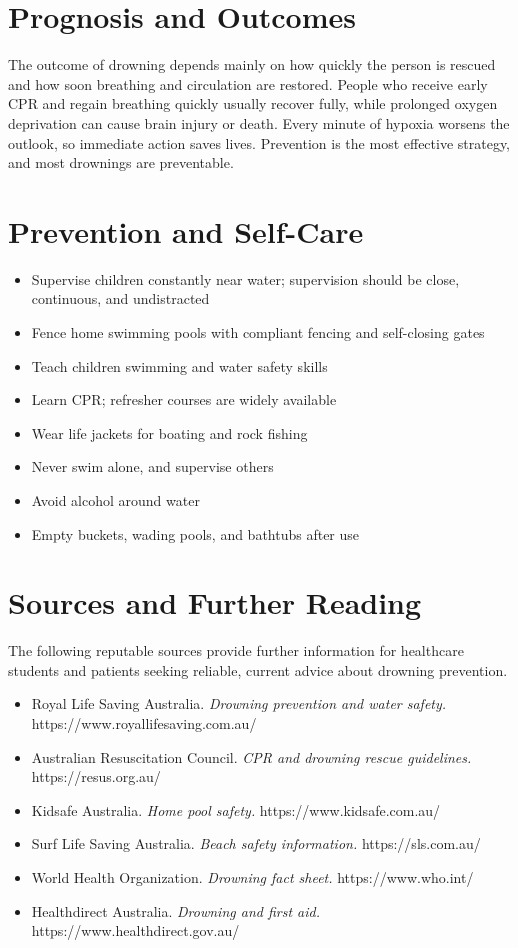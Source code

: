 \section*{Prognosis and Outcomes}
The outcome of drowning depends mainly on how quickly the person is rescued and how soon breathing and circulation are restored. People who receive early CPR and regain breathing quickly usually recover fully, while prolonged oxygen deprivation can cause brain injury or death. Every minute of hypoxia worsens the outlook, so immediate action saves lives. Prevention is the most effective strategy, and most drownings are preventable.

\section*{Prevention and Self-Care}
\begin{itemize}
    \item Supervise children constantly near water; supervision should be close, continuous, and undistracted
    \item Fence home swimming pools with compliant fencing and self-closing gates
    \item Teach children swimming and water safety skills
    \item Learn CPR; refresher courses are widely available
    \item Wear life jackets for boating and rock fishing
    \item Never swim alone, and supervise others
    \item Avoid alcohol around water
    \item Empty buckets, wading pools, and bathtubs after use
\end{itemize}

\section*{Sources and Further Reading}
The following reputable sources provide further information for healthcare students and patients seeking reliable, current advice about drowning prevention.

\begin{itemize}
    \item Royal Life Saving Australia. \textit{Drowning prevention and water safety.} https://www.royallifesaving.com.au/
    \item Australian Resuscitation Council. \textit{CPR and drowning rescue guidelines.} https://resus.org.au/
    \item Kidsafe Australia. \textit{Home pool safety.} https://www.kidsafe.com.au/
    \item Surf Life Saving Australia. \textit{Beach safety information.} https://sls.com.au/
    \item World Health Organization. \textit{Drowning fact sheet.} https://www.who.int/
    \item Healthdirect Australia. \textit{Drowning and first aid.} https://www.healthdirect.gov.au/
\end{itemize}
